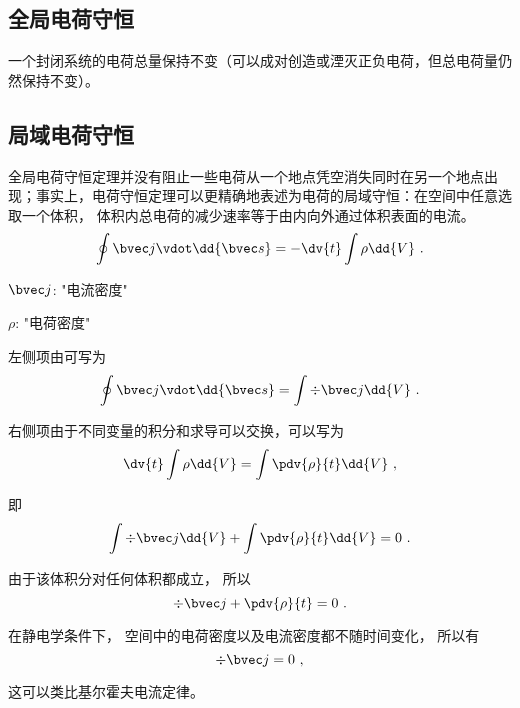 
\subsection{全局电荷守恒}
一个封闭系统的电荷总量保持不变\cite{GriffE}（可以成对创造或湮灭正负电荷，但总电荷量仍然保持不变）。

\subsection{局域电荷守恒}
全局电荷守恒定理并没有阻止一些电荷从一个地点凭空消失同时在另一个地点出现；事实上，电荷守恒定理可以更精确地表述为电荷的局域守恒：在空间中任意选取一个体积， 体积内总电荷的减少速率等于由内向外通过体积表面的电流。\cite{GriffE}
\begin{equation}
\oint \bvec j \vdot \dd{\bvec s}  =  - \dv{t} \int \rho \dd{V}~.
\end{equation} 

$\bvec j$: "电流密度"

$\rho$: "电荷密度"

左侧项由可写为
\begin{equation}
\oint \bvec j \vdot \dd{\bvec s}  =\int \div \bvec j \dd{V}~.
\end{equation} 

右侧项由于不同变量的积分和求导可以交换，可以写为 %
\begin{equation}
\dv{t} \int \rho  \dd{V}  = \int \pdv{\rho}{t} \dd{V}~,
\end{equation}

即
\begin{equation}
\int \div \bvec j \dd{V} + \int \pdv{\rho}{t} \dd{V} = 0~.
\end{equation} 

由于该体积分对任何体积都成立， 所以
\begin{equation}\label{eq_ChgCsv_4}
\div \bvec j + \pdv{\rho}{t} = 0~.
\end{equation}

在静电学条件下， 空间中的电荷密度以及电流密度都不随时间变化， 所以有
\begin{equation}
\div \bvec j = 0~,
\end{equation}

这可以类比基尔霍夫电流定律。
